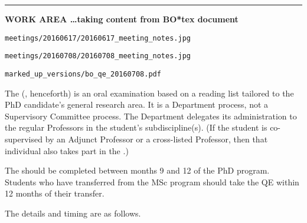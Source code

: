 
\cp


\hrule
\textbf{WORK AREA \ldots taking content from BO*tex document}

\texttt{meetings/20160617/20160617\_meeting\_notes.jpg}

\texttt{meetings/20160708/20160708\_meeting\_notes.jpg}

\texttt{marked\_up\_versions/bo\_qe\_20160708.pdf}

The \QE (\qe, henceforth) is an oral examination based on a reading list
tailored to the PhD candidate's general research area. It is a Department
process, not a Supervisory Committee process. The Department delegates its
administration to the regular Professors in the student's subdiscipline(s).
(If the student is co-supervised by an Adjunct Professor or a cross-listed
Professor, then that individual also takes part in the \qe.)

The \qe should be completed between months 9 and 12 of the PhD program.
Students who have transferred from the MSc program should take the QE within 12
months of their transfer.

The details and timing are as follows.

